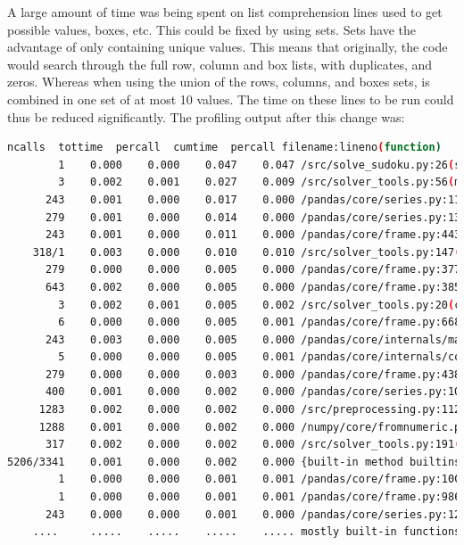 \documentclass[12pt]{report} %
\begin{document}
A large amount of time was being spent on list comprehension lines used to get possible values, boxes, etc. This could be fixed by using sets. Sets have the advantage of only containing unique values\cite{freecodecamp_python_set_vs_list}. This means that originally, the code would search through the full row, column and box lists, with duplicates, and zeros. Whereas when using the union of the rows, columns, and boxes sets, is combined in one set of at most 10 values. The time on these lines to be run could thus be reduced significantly. The profiling output after this change was:

\begin{lstlisting}[language=Bash, caption={Profiling output after list comprehension improvements}, basicstyle=\tiny]
   ncalls  tottime  percall  cumtime  percall filename:lineno(function)
        1    0.000    0.000    0.047    0.047 /src/solve_sudoku.py:26(solve_sudoku)
        3    0.002    0.001    0.027    0.009 /src/solver_tools.py:56(markup)
      243    0.001    0.000    0.017    0.000 /pandas/core/series.py:1180(__setitem__)
      279    0.001    0.000    0.014    0.000 /pandas/core/series.py:1396(_maybe_update_cacher)
      243    0.001    0.000    0.011    0.000 /pandas/core/frame.py:4430(_maybe_cache_changed)
    318/1    0.003    0.000    0.010    0.010 /src/solver_tools.py:147(backtrack_alg)
      279    0.000    0.000    0.005    0.000 /pandas/core/frame.py:3779(_ixs)
      643    0.002    0.000    0.005    0.000 /pandas/core/frame.py:3856(__getitem__)
        3    0.002    0.001    0.005    0.002 /src/solver_tools.py:20(check_sudoku)
        6    0.000    0.000    0.005    0.001 /pandas/core/frame.py:668(__init__)
      243    0.003    0.000    0.005    0.000 /pandas/core/internals/managers.py:1045(iset)
        5    0.000    0.000    0.005    0.001 /pandas/core/internals/construction.py:423(dict_to_mgr)
      279    0.000    0.000    0.003    0.000 /pandas/core/frame.py:4387(_box_col_values)
      400    0.001    0.000    0.002    0.000 /pandas/core/series.py:1016(__getitem__)
     1283    0.002    0.000    0.002    0.000 /src/preprocessing.py:112(box)
     1288    0.001    0.000    0.002    0.000 /numpy/core/fromnumeric.py:1768(ravel)
      317    0.002    0.000    0.002    0.000 /src/solver_tools.py:191(<listcomp>)
5206/3341    0.001    0.000    0.002    0.000 {built-in method builtins.len}
        1    0.000    0.000    0.001    0.001 /pandas/core/frame.py:10039(map)
        1    0.000    0.000    0.001    0.001 /pandas/core/frame.py:9867(apply)
      243    0.000    0.000    0.001    0.000 /pandas/core/series.py:1270(_set_with_engine)
    ....     .....    .....    .....    ..... mostly built-in functions of packages

\end{lstlisting}
\end{document}
